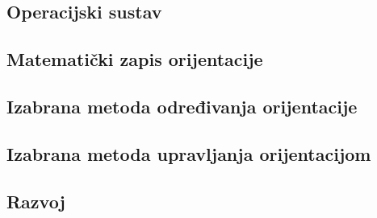\documentclass[times, utf8, diplomski, numeric]{templates/template}
\begin{document}
{{        \subsection{Operacijski sustav}{
        }

        \subsection{Matematički zapis orijentacije}{
        }
    
        \subsection{Izabrana metoda određivanja orijentacije}{
        }
    
        \subsection{Izabrana metoda upravljanja orijentacijom}{
        }

        \subsection{Razvoj}{
        }
    }
}
\end{document}
